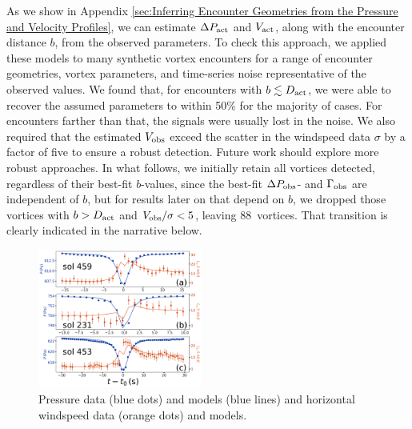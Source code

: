 \documentclass{aastex63}
\newcommand{\boverDactltone}{88}
\begin{document}
As we show in Appendix \ref{sec:Inferring Encounter Geometries from the Pressure and Velocity Profiles}, we can estimate $\Delta P_{\rm act}$ and $V_{\rm act}$, along with the encounter distance $b$, from the observed parameters. To check this approach, we applied these models to many synthetic vortex encounters for a range of encounter geometries, vortex parameters, and time-series noise representative of the observed values. We found that, for encounters with $b \lesssim D_{\rm act}$, we were able to recover the assumed parameters to within 50\% for the majority of cases. For encounters farther than that, the signals were usually lost in the noise. We also required that the estimated $V_{\rm obs}$ exceed the scatter in the windspeed data $\sigma$ by a factor of five to ensure a robust detection. Future work should explore more robust approaches. In what follows, we initially retain all vortices detected, regardless of their best-fit $b$-values, since the best-fit $\Delta P_{\rm obs}$- and $\Gamma_{\rm obs}$ are independent of $b$, but for results later on that depend on $b$, we dropped those vortices with $b > D_{\rm act}$ and $V_{\rm obs}/\sigma < 5$, leaving \boverDactltone\ vortices. That transition is clearly indicated in the narrative below.

\begin{figure}
\centering
\includegraphics[width=0.48\textwidth]{figures/vortices_and_windspeed.png}
\caption{Pressure data (blue dots) and models (blue lines) and horizontal windspeed data (orange dots) and models. \label{fig:vortices_and_windspeed}}
\end{figure}
\end{document}
